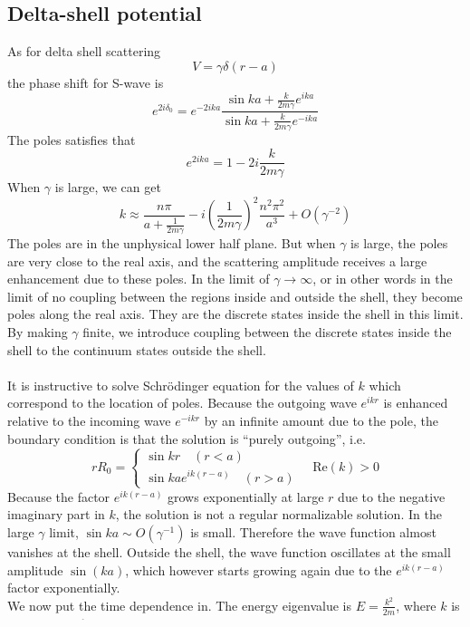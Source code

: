 \documentclass[cyan]{elegantnote}
\begin{document}
\subsection{Delta-shell potential}
As for delta shell scattering
\[V = \gamma\delta(r-a)\]
the phase shift for S-wave is
\[e^{2i\delta_0} = e^{-2ika}\frac{\sin ka + \frac{k}{2m\gamma}e^{ika}}{\sin ka + \frac{k}{2m\gamma}e^{-ika}}\]
The poles satisfies that
\[e^{2ika} = 1 - 2i\frac{k}{2m\gamma}\]
When $\gamma$ is large, we can get
\[k \approx \frac{n\pi}{a + \frac{1}{2m\gamma}} -i \left(\frac{1}{2m\gamma} \right)^2 \frac{n^2\pi^2}{a^3} + O(\gamma^{-2})\]
The poles are in the unphysical lower half plane. But when $\gamma$ is large, the poles are very close to the real axis, and the scattering amplitude receives a large enhancement due to these poles. 
In the limit of $\gamma \to \infty$, or in other words in the limit of no coupling between the regions inside and outside the shell, they become poles along the real axis. 
They are the discrete states inside the shell in this limit. 
By making $\gamma$ finite, we introduce coupling between the discrete states inside the shell to the continuum states outside the shell.
\\ \\
It is instructive to solve Schrödinger equation for the values of $k$ which correspond to the location of poles. Because the outgoing wave $e^{ikr}$ is enhanced relative to the incoming wave $e^{-ikr}$ by an infinite amount due to the pole, the boundary condition is that the solution is ``purely outgoing'', i.e.
\[rR_0 = \begin{cases} \sin kr \quad (r<a) \\ \sin ka e^{ik(r-a)} \quad (r>a)  \end{cases} \quad \mathrm{Re}(k) > 0\]
Because the factor $e^{ik(r-a)}$ grows exponentially at large $r$ due to the negative imaginary part in $k$, the solution is not a regular normalizable solution.
In the large $\gamma$ limit, $\sin ka \sim O(\gamma^{-1})$ is small. Therefore the wave function almost vanishes at the shell.
Outside the shell, the wave function oscillates at the small amplitude $\sin(ka)$, which however starts growing again due to the $e^{ik(r-a)}$ factor exponentially.
\\
We now put the time dependence in. The energy eigenvalue
is $E = \frac{k^2}{2m}$, where $k$ is at the pole. If the pole is at
\[k = k_0 - i\kappa\]
the energy eigenvalue is at
\[E = E_0 - i\frac{\Gamma}{2} = \frac{k_0^2}{2m} - i \frac{k_0\kappa}{m} + O(\kappa^2)\]
For instance in the large $\gamma$ limit
\end{document}
